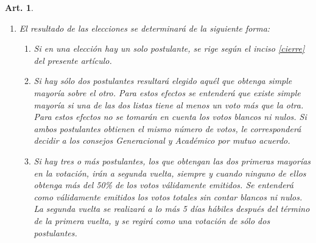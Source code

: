 \documentclass[letterpaper,11pt]{article}
\theoremstyle{plain}
\newtheorem{art}{Art.} %
\begin{document}
\begin{art}
\begin{enumerate}
				\item El resultado de las elecciones se determinará de la siguiente forma:
					\begin{enumerate}
						\item Si en una elección hay un solo postulante, se rige según el inciso \ref{cierre} del presente artículo.
						\item Si hay sólo dos postulantes resultará elegido aquél que obtenga simple mayoría sobre el otro. Para estos efectos se entenderá que existe simple mayoría si una de las dos listas tiene al menos un voto más que la otra. Para estos efectos no se tomarán en cuenta los votos blancos ni nulos. Si ambos postulantes obtienen el mismo número de votos, le corresponderá decidir a los consejos Generacional y Académico por mutuo acuerdo.
						\item Si hay tres o más postulantes, los que obtengan las dos primeras mayorías en la votación, irán a segunda vuelta, siempre y cuando ninguno de ellos obtenga más del 50\% de los votos válidamente emitidos. Se entenderá como válidamente emitidos los votos totales sin contar blancos ni nulos. La segunda vuelta se realizará a lo más 5 días hábiles después del término de la primera vuelta, y se regirá como una votación de sólo dos postulantes.
					\end{enumerate}
			\end{enumerate}
		\end{art}
\end{document}
